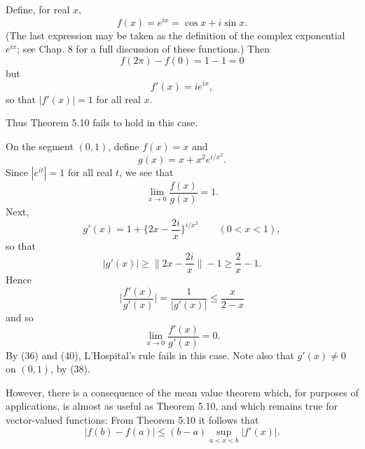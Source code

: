 \documentclass[../poma-notes.tex]{subfiles}
\begin{document}
\begin{example}
  Define, for real $x$,
  \begin{equation}
    f(x) = e^{ix} = \cos x + i \sin x.
  \end{equation}
  (The last expression may be taken as the definition of the complex exponential $e^{ix}$; see Chap. 8 for a full
  discussion of these functions.) Then
  \begin{equation}
    f(2\pi) - f(0) = 1 - 1 = 0
  \end{equation}
  but
  \begin{equation}
    f'(x) = i e^{ix},
  \end{equation}
  so that $|f'(x)| = 1$ for all real $x$.

  Thus Theorem 5.10 fails to hold in this case.
\end{example}

\begin{example}
  On the segment $(0,1)$, define $f(x) = x$ and
  \begin{equation}
    g(x) = x + x^2 e^{i/x^2}.
  \end{equation}
  Since $|e^{it}| = 1$ for all real $t$, we see that
  \begin{equation}
    \lim_{x\to 0} \frac{f(x)}{g(x)} = 1.
  \end{equation}
  Next,
  \begin{equation}
    g'(x) = 1 + \biggl\{ 2x - \frac{2i}{x} \biggr\}^{i/x^2} \qquad (0<x<1),
  \end{equation}
  so that
  \begin{equation}
    |g'(x)| \ge \biggl\| 2x - \frac{2i}{x} \biggr\| - 1 \ge \frac{2}{x} - 1.
  \end{equation}
  Hence
  \begin{equation}
    \biggl| \frac{f'(x)}{g'(x)} \biggr| = \frac{1}{|g'(x)|} \le \frac{x}{2-x}
  \end{equation}
  and so
  \begin{equation}
    \lim_{x\to 0} \frac{f'(x)}{g'(x)} = 0.
  \end{equation}
  By (36) and (40), L'Hospital's rule fails in this case. Note also that $g'(x) \ne 0$ on $(0,1)$, by (38).

  However, there is a consequence of the mean value theorem which, for purposes of applications, is almost as useful
  as Theorem 5.10, and which remains true for vector-valued functions: From Theorem 5.10 it follows that
  \begin{equation}
    |f(b) - f(a)| \le (b-a) \sup_{a<x<b} |f'(x)|.
  \end{equation}
\end{example}
\end{document}
